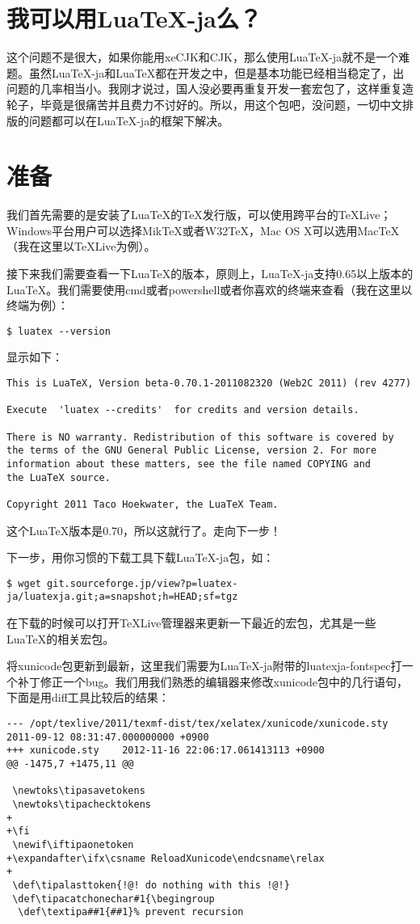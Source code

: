 \documentclass{article}
\begin{document}
\section{我可以用LuaTeX-ja么？}
这个问题不是很大，如果你能用xeCJK和CJK，那么使用LuaTeX-ja就不是一个难题。虽然LuaTeX-ja和LuaTeX都在开发之中，但是基本功能已经相当稳定了，出问题的几率相当小。我刚才说过，国人没必要再重复开发一套宏包了，这样重复造轮子，毕竟是很痛苦并且费力不讨好的。所以，用这个包吧，没问题，一切中文排版的问题都可以在LuaTeX-ja的框架下解决。
\section{准备}
我们首先需要的是安装了LuaTeX的TeX发行版，可以使用跨平台的TeXLive；Windows平台用户可以选择MikTeX或者W32TeX，Mac OS X可以选用MacTeX（我在这里以TeXLive为例）。

接下来我们需要查看一下LuaTeX的版本，原则上，LuaTeX-ja支持0.65以上版本的LuaTeX。我们需要使用cmd或者powershell或者你喜欢的终端来查看（我在这里以终端为例）：
\indent\begin{verbatim}
$ luatex --version
\end{verbatim}

显示如下：
\indent\begin{verbatim}
This is LuaTeX, Version beta-0.70.1-2011082320 (Web2C 2011) (rev 4277)

Execute  'luatex --credits'  for credits and version details.

There is NO warranty. Redistribution of this software is covered by
the terms of the GNU General Public License, version 2. For more
information about these matters, see the file named COPYING and
the LuaTeX source.

Copyright 2011 Taco Hoekwater, the LuaTeX Team.
\end{verbatim}
这个LuaTeX版本是0.70，所以这就行了。走向下一步！

下一步，用你习惯的下载工具下载LuaTeX-ja包，如：
\begin{verbatim}
$ wget git.sourceforge.jp/view?p=luatex-ja/luatexja.git;a=snapshot;h=HEAD;sf=tgz
\end{verbatim}

在下载的时候可以打开TeXLive管理器来更新一下最近的宏包，尤其是一些LuaTeX的相关宏包。

将xunicode包更新到最新，这里我们需要为LuaTeX-ja附带的luatexja-fontspec打一个补丁修正一个bug。我们用我们熟悉的编辑器来修改xunicode包中的几行语句，下面是用diff工具比较后的结果：
\begin{verbatim}
--- /opt/texlive/2011/texmf-dist/tex/xelatex/xunicode/xunicode.sty	2011-09-12 08:31:47.000000000 +0900
+++ xunicode.sty	2012-11-16 22:06:17.061413113 +0900
@@ -1475,7 +1475,11 @@
 
 \newtoks\tipasavetokens
 \newtoks\tipachecktokens
+
+\fi
 \newif\iftipaonetoken
+\expandafter\ifx\csname ReloadXunicode\endcsname\relax
+
 \def\tipalasttoken{!@! do nothing with this !@!}
 \def\tipacatchonechar#1{\begingroup
  \def\textipa##1{##1}% prevent recursion
\end{verbatim}
\end{document}
